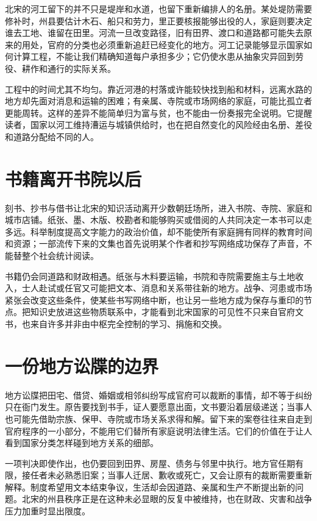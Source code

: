 北宋的河工留下的并不只是堤岸和水道，也留下重新编排人的名册。某处堤防需要修补时，州县要估计木石、船只和劳力，里正要核报能够出役的人，家庭则要决定谁去工地、谁留在田里。河流一旦改变路径，旧有田界、渡口和道路都可能失去原来的用处，官府的分类也必须重新追赶已经变化的地方。河工记录能够显示国家如何计算工程，不能让我们精确知道每户承担多少；它仍使水患从抽象灾异回到劳役、耕作和通行的实际关系。

工程中的时间尤其不均匀。靠近河港的村落或许能较快找到船和材料，远离水路的地方却先面对消息和运输的困难；有亲属、寺院或市场网络的家庭，可能比孤立者更能周转。这样的差异不能简单归为富与贫，也不能由一份奏报完全说明。它提醒读者，国家以河工维持漕运与城镇供给时，也在把自然变化的风险经由名册、差役和道路分配给不同的人。

\section{书籍离开书院以后}

刻书、抄书与借书让北宋的知识活动离开少数朝廷场所，进入书院、寺院、家庭和城市店铺。纸张、墨、木版、校勘者和能够购买或借阅的人共同决定一本书可以走多远。科举制度提高文字能力的政治价值，却不能使所有家庭拥有同样的教育时间和资源；一部流传下来的文集也首先说明某个作者和抄写网络成功保存了声音，不能替整个社会统计阅读。

书籍仍会同道路和财政相遇。纸张与木料要运输，书院和寺院需要施主与土地收入，士人赴试或任官又可能把文本、消息和关系带往新的地方。战争、河患或市场紧张会改变这些条件，使某些书写网络中断，也让另一些地方成为保存与重印的节点。把知识史放进这些物质联系中，才能看到北宋国家的可见性不只来自官府文书，也来自许多并非由中枢完全控制的学习、捐施和交换。

\section{一份地方讼牒的边界}

地方讼牒把田宅、借贷、婚姻或相邻纠纷写成官府可以裁断的事情，却不等于纠纷只在衙门发生。原告要找到书手，证人要愿意出面，文书要沿着层级递送；当事人也可能先借助宗族、保甲、寺院或市场关系求得和解。留下来的案卷往往来自走到官府程序的一小部分，不能用它们替所有家庭说明法律生活。它们的价值在于让人看到国家分类怎样碰到地方关系的细部。

一项判决即使作出，也仍要回到田界、房屋、债务与邻里中执行。地方官任期有限，接任者未必熟悉旧案；当事人迁居、歉收或死亡，又会让原有的裁断需要重新解释。制度希望用文本结束争议，生活却会因道路、亲属和生产不断提出新的问题。北宋的州县秩序正是在这种未必显眼的反复中被维持，也在财政、灾害和战争压力加重时显出限度。

